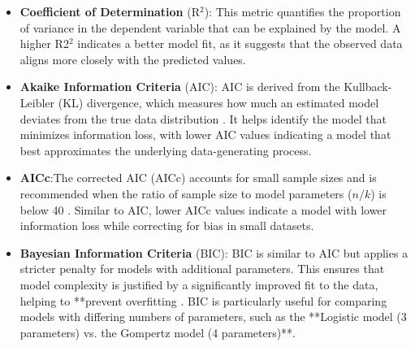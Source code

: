 \documentclass[11pt]{article}
\begin{document}
\begin{itemize}
    \item \textbf{Coefficient of Determination} (R\(^2\)): This metric quantifies the proportion of variance in the dependent variable that can be explained by the model. A higher R2$^2$ indicates a better model fit, as it suggests that the observed data aligns more closely with the predicted values.
    
    \item \textbf{Akaike Information Criteria} (AIC): AIC is derived from the Kullback-Leibler (KL) divergence, which measures how much an estimated model deviates from the true data distribution \parencite[]{Akaike1992}. It helps identify the model that minimizes information loss, with lower AIC values indicating a model that best approximates the underlying data-generating process. 
    
    \item \textbf{AICc}:The corrected AIC (AICc) accounts for small sample sizes and is recommended when the ratio of sample size to model parameters (\( n/k \)) is below 40 \parencite{burnham2002model}. Similar to AIC, lower AICc values indicate a model with lower information loss while correcting for bias in small datasets.


    \item \textbf{Bayesian Information Criteria} (BIC): BIC is similar to AIC but applies a stricter penalty for models with additional parameters. This ensures that model complexity is justified by a significantly improved fit to the data, helping to **prevent overfitting \parencite{Wagenmakers2004, hastie2008}. BIC is particularly useful for comparing models with differing numbers of parameters, such as the **Logistic model (3 parameters) vs. the Gompertz model (4 parameters)**.

\end{itemize}
\end{document}
